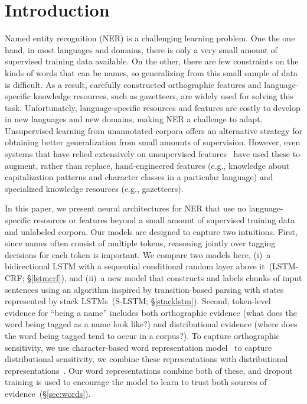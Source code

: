 \documentclass[11pt,letterpaper]{article}
\begin{document}
\section{Introduction}

Named entity recognition (NER) is a challenging learning problem. One the one hand, in most languages and domains, there is only a very small amount of supervised training data available. On the other, there are few constraints on the kinds of words that can be names, so generalizing from this small sample of data is difficult. As a result, carefully constructed orthographic features and language-specific knowledge resources, such as gazetteers, are widely used for solving this task. Unfortunately, language-specific resources and features are costly to develop in new languages and new domains, making NER a challenge to adapt. Unsupervised learning from unannotated corpora offers an alternative strategy for obtaining better generalization from small amounts of supervision. However, even systems that have relied extensively on unsupervised features~\cite[\emph{inter alia}]{collobert2011natural,turian:2010,lin2009phrase,ando:2005} have used these to augment, rather than replace, hand-engineered features (e.g., knowledge about capitalization patterns and character classes in a particular language) and specialized knowledge resources (e.g., gazetteers).

In this paper, we present neural architectures for NER that use no language-specific resources or features beyond a small amount of supervised training data and unlabeled corpora. Our models are designed to capture two intuitions. First, since names often consist of multiple tokens, reasoning jointly over tagging decisions for each token is important. We compare two models here, (i)~a bidirectional LSTM with a sequential conditional random layer above it~(LSTM-CRF; \S\ref{lstmcrf}), and (ii)~a new model that constructs and labels chunks of input sentences using an algorithm inspired by transition-based parsing with states represented by stack LSTMs~(S-LSTM; \S\ref{stacklstm}). Second, token-level evidence for ``being a name'' includes both orthographic evidence (what does the word being tagged as a name look like?) and distributional evidence (where does the word being tagged tend to occur in a corpus?). To capture orthographic sensitivity, we use character-based word representation model~\cite{ling:2015} to capture distributional sensitivity, we combine these representations with distributional representations~\cite{mikolov2013distributed}. Our word representations combine both of these, and dropout training is used to encourage the model to learn to trust both sources of evidence~(\S\ref{sec:words}).
\end{document}
